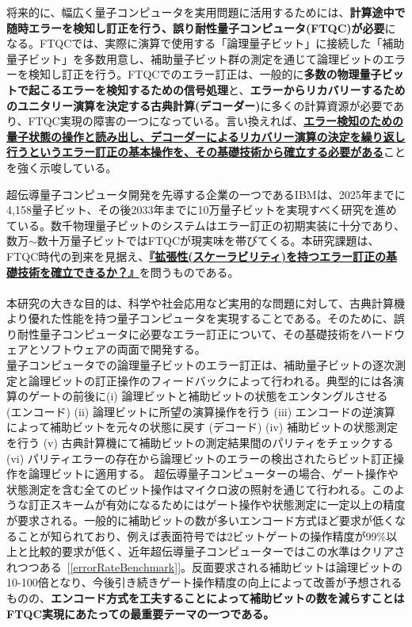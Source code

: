 \documentclass[11pt,a4j,dvipdfmx]{jarticle} 					%
\newcommand{\研究課題名}{誤り耐性量子コンピュータに向けた誤り訂正技術の開発(仮)}
\newcommand{\研究機関名}{東京大学}
\newcommand{\研究代表者氏名}{寺師弘二}
\newcommand{\研究期間の最終元号年度}{10}  %
\newcommand{\mybf}[1]{{\bfseries\sffamily#1}}
\begin{document}
将来的に、幅広く量子コンピュータを実用問題に活用するためには、\mybf{計算途中で随時エラーを検知し訂正を行う、誤り耐性量子コンピュータ(FTQC)が必要}になる。FTQCでは、実際に演算で使用する「論理量子ビット」に接続した「補助量子ビット」を多数用意し、補助量子ビット群の測定を通じて論理ビットのエラーを検知し訂正を行う。FTQCでのエラー訂正は、一般的に\mybf{多数の物理量子ビットで起こるエラーを検知するための信号処理}と、\mybf{エラーからリカバリーするためのユニタリー演算を決定する古典計算(デコーダー)}に多くの計算資源が必要であり、FTQC実現の障害の一つになっている。言い換えれば、\mybf{\ul{エラー検知のための量子状態の操作と読み出し、デコーダーによるリカバリー演算の決定を繰り返し行うというエラー訂正の基本操作を、その基礎技術から確立する必要がある}}ことを強く示唆している。

超伝導量子コンピュータ開発を先導する企業の一つであるIBMは、2025年までに4,158量子ビット、その後2033年までに10万量子ビットを実現すべく研究を進めている。数千物理量子ビットのシステムはエラー訂正の初期実装に十分であり、数万$\sim$数十万量子ビットではFTQCが現実味を帯びてくる。本研究課題は、FTQC時代の到来を見据え、\mybf{\ul{『拡張性(スケーラビリティ)を持つエラー訂正の基礎技術を確立できるか？』}}を問うものである。\\

\\
本研究の大きな目的は、科学や社会応用など実用的な問題に対して、古典計算機より優れた性能を持つ量子コンピュータを実現することである。そのために、誤り耐性量子コンピュータに必要なエラー訂正について、その基礎技術をハードウェアとソフトウェアの両面で開発する。 \\

量子コンピュータでの論理量子ビットのエラー訂正は、補助量子ビットの逐次測定と論理ビットの訂正操作のフィードバックによって行われる。典型的には各演算のゲートの前後に(i) 論理ビットと補助ビットの状態をエンタングルさせる (エンコード) (ii) 論理ビットに所望の演算操作を行う (iii) エンコードの逆演算によって補助ビットを元々の状態に戻す (デコード) (iv) 補助ビットの状態測定を行う (v) 古典計算機にて補助ビットの測定結果間のパリティをチェックする (vi) パリティエラーの存在から論理ビットのエラーの検出されたらビット訂正操作を論理ビットに適用する。
%
超伝導量子コンピューターの場合、ゲート操作や状態測定を含む全てのビット操作はマイクロ波の照射を通じて行われる。このような訂正スキームが有効になるためにはゲート操作や状態測定に一定以上の精度が要求される。一般的に補助ビットの数が多いエンコード方式ほど要求が低くなることが知られており、例えば表面符号では2ビットゲートの操作精度が99\%以上と比較的要求が低く、近年超伝導量子コンピューターではこの水準はクリアされつつある~[\ref{errorRateBenchmark}]。反面要求される補助ビットは論理ビットの10-100倍となり、今後引き続きゲート操作精度の向上によって改善が予想されるものの、\mybf{エンコード方式を工夫することによって補助ビットの数を減らすことはFTQC実現にあたっての最重要テーマの一つである。} \\
\end{document}
